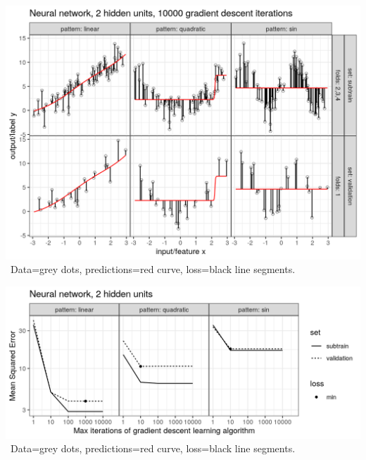 \begin{frame}
  \includegraphics[width=\textwidth]{figure-overfitting-pred-units=2-maxit=10000.png}
\
Data=grey dots, predictions=red curve, loss=black line segments.
\end{frame}


\begin{frame}
  \includegraphics[width=\textwidth]{figure-overfitting-data-loss-2.png}
\
Data=grey dots, predictions=red curve, loss=black line segments.
\end{frame}

